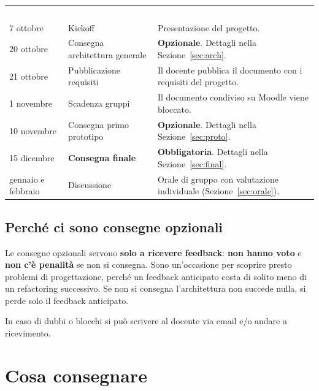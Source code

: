 \documentclass[11pt,a4paper]{article}
\begin{document}
\begin{center}
\renewcommand{\arraystretch}{1.4}
\begin{tabularx}{\linewidth}{@{}L{2.7cm}L{4.4cm}Y@{}}
  \textcolor{white}{\bfseries Data} & \textcolor{white}{\bfseries Evento} & \textcolor{white}{\bfseries Note} \\
  7 ottobre    & Kickoff                         & Presentazione del progetto. \\
  20 ottobre   & Consegna architettura generale  & \textbf{Opzionale}. Dettagli nella Sezione~\ref{sec:arch}. \\
  21 ottobre   & Pubblicazione requisiti         & Il docente pubblica il documento con i requisiti del progetto. \\
  1 novembre   & Scadenza gruppi                 & Il documento condiviso su Moodle viene bloccato. \\
  10 novembre  & Consegna primo prototipo        & \textbf{Opzionale}. Dettagli nella Sezione~\ref{sec:proto}. \\
  15 dicembre  & \textbf{Consegna finale}        & \textbf{Obbligatoria}. Dettagli nella Sezione~\ref{sec:final}. \\
  gennaio e febbraio & Discussione                 & Orale di gruppo con valutazione individuale (Sezione~\ref{sec:orale}). \\
\end{tabularx}
\end{center}

\subsection{Perché ci sono consegne opzionali}
\begin{notebox}
Le consegne opzionali servono \textbf{solo a ricevere feedback}: \textbf{non hanno voto} e
\textbf{non c'è penalità} se non si consegna. Sono un'occasione per scoprire presto problemi di
progettazione, perché un feedback anticipato costa di solito meno di un refactoring successivo.
Se non si consegna l'architettura non succede nulla, si perde solo il feedback anticipato.
\end{notebox}

In caso di dubbi o blocchi si può scrivere al docente via email e/o andare a ricevimento.

\section{Cosa consegnare}
\end{document}
